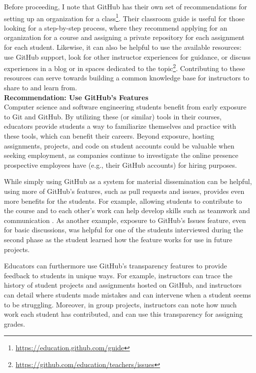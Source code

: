 Before proceeding, I note that GitHub has their own set of recommendations for setting up an organization for a class\footnote{\url{https://education.github.com/guide}}. Their classroom guide is useful for those looking for a step-by-step process, where they recommend applying for an organization for a course and assigning a private repository for each assignment for each student. Likewise, it can also be helpful to use the available resources: use GitHub support, look for other instructor experiences for guidance, or discuss experiences in a blog or in spaces dedicated to the topic\footnote{\url{https://github.com/education/teachers/issues}}. Contributing to these resources can serve towards building a common knowledge base for instructors to share to and learn from. \\

\textbf{Recommendation: Use GitHub's Features} \\
Computer science and software engineering students benefit from early exposure to Git and GitHub. By utilizing these (or similar) tools in their courses, educators provide students a way to familiarize themselves and practice with these tools, which can benefit their careers. Beyond exposure, hosting assignments, projects, and code on student accounts could be valuable when seeking employment, as companies continue to investigate the online presence prospective employees have (e.g., their GitHub accounts) for hiring purposes.

While simply using GitHub as a system for material dissemination can be helpful, using more of GitHub's features, such as pull requests and issues, provides even more benefits for the students. For example, allowing students to contribute to the course and to each other's work can help develop skills such as teamwork and communication \cite{hamer2006some}. As another example, exposure to GitHub's Issues feature, even for basic discussions, was helpful for one of the students interviewed during the second phase as the student learned how the feature works for use in future projects.

Educators can furthermore use GitHub's transparency features to provide feedback to students in unique ways. For example, instructors can trace the history of student projects and assignments hosted on GitHub, and instructors can detail where students made mistakes and can intervene when a student seems to be struggling. Moreover, in group projects, instructors can note how much work each student has contributed, and can use this transparency for assigning grades.

